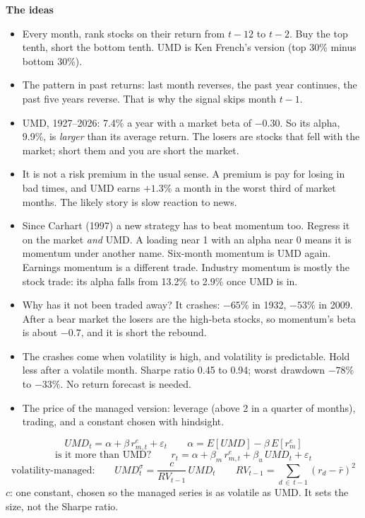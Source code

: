 \documentclass[11pt]{article}
\newcounter{ex}[section]
\newcommand{\head}[1]{\par\medskip\textbf{#1}\par}
\newcommand{\re}{r^{e}}
\newcommand{\RV}{\mathit{RV}}
\begin{document}
\head{The ideas}
\begin{itemize}
\item Every month, rank stocks on their return from $t-12$ to $t-2$. Buy the top tenth, short the bottom tenth. UMD is
Ken French's version (top 30\% minus bottom 30\%).
\item The pattern in past returns: last month reverses, the past year continues, the past five years reverse. That is
why the signal skips month $t-1$.
\item UMD, 1927--2026: 7.4\% a year with a market beta of $-0.30$. So its alpha, 9.9\%, is \emph{larger} than its average
return. The losers are stocks that fell with the market; short them and you are short the market.
\item It is not a risk premium in the usual sense. A premium is pay for losing in bad times, and UMD earns $+1.3\%$ a
month in the worst third of market months. The likely story is slow reaction to news.
\item Since Carhart (1997) a new strategy has to beat momentum too. Regress it on the market \emph{and} UMD. A loading
near 1 with an alpha near 0 means it is momentum under another name. Six-month momentum is UMD again. Earnings
momentum is a different trade. Industry momentum is mostly the stock trade: its alpha falls from 13.2\% to 2.9\% once
UMD is in.
\item Why has it not been traded away? It crashes: $-65\%$ in 1932, $-53\%$ in 2009. After a bear market the losers are
the high-beta stocks, so momentum's beta is about $-0.7$, and it is short the rebound.
\item The crashes come when volatility is high, and volatility is predictable. Hold less after a volatile month. Sharpe
ratio 0.45 to 0.94; worst drawdown $-78\%$ to $-33\%$. No return forecast is needed.
\item The price of the managed version: leverage (above 2 in a quarter of months), trading, and a constant chosen with
hindsight.
\end{itemize}

\begin{keybox}
\[ UMD_{t} = \alpha + \beta\,\re_{m,t} + \varepsilon_{t} \qquad \alpha = E[UMD] - \beta\,E[\re_{m}] \]
\[ \text{is it more than UMD?}\qquad r_{t} = \alpha + \beta_{m}\,\re_{m,t} + \beta_{u}\,UMD_{t} + \varepsilon_{t} \]
\[ \text{volatility-managed:}\qquad UMD^{\sigma}_{t} = \frac{c}{\RV_{t-1}}\,UMD_{t}
   \qquad \RV_{t-1} = \sum_{d\,\in\,t-1}(r_{d} - \bar r)^{2} \]
{\small $c$: one constant, chosen so the managed series is as volatile as UMD. It sets the size, not the Sharpe ratio.}
\end{keybox}
\end{document}
